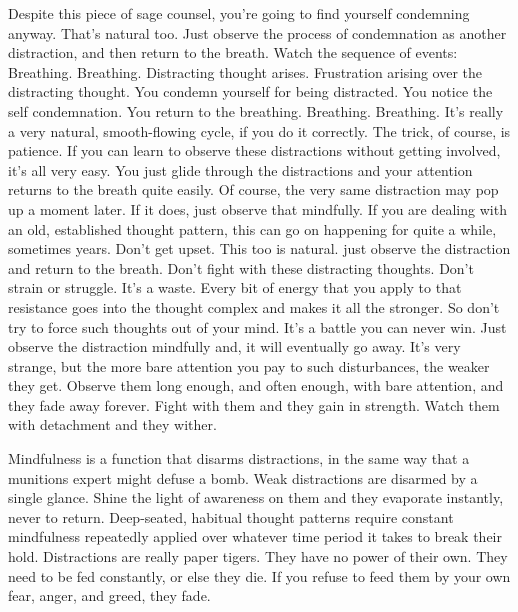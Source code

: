Despite this piece of sage counsel, you're going to find yourself condemning
anyway. That's natural too. Just observe the process of condemnation as another
distraction, and then return to the breath.  Watch the sequence of events:
Breathing. Breathing. Distracting thought arises.  Frustration arising over the
distracting thought.  You condemn yourself for being distracted. You notice the
self condemnation. You return to the breathing. Breathing. Breathing.  It's
really a very natural, smooth-flowing cycle, if you do it correctly. The trick,
of course, is patience. If you can learn to observe these distractions without
getting involved, it's all very easy. You just glide through the distractions
and your attention returns to the breath quite easily. Of course, the very same
distraction may pop up a moment later. If it does, just observe that mindfully.
If you are dealing with an old, established thought pattern, this can go on
happening for quite a while, sometimes years. Don't get upset.  This too is
natural. just observe the distraction and return to the breath.  Don't fight
with these distracting thoughts. Don't strain or struggle. It's a waste. Every
bit of energy that you apply to that resistance goes into the thought complex
and makes it all the stronger. So don't try to force such thoughts out of your
mind. It's a battle you can never win. Just observe the distraction mindfully
and, it will eventually go away. It's very strange, but the more bare attention
you pay to such disturbances, the weaker they get.  Observe them long enough,
and often enough, with bare attention, and they fade away forever. Fight with
them and they gain in strength. Watch them with detachment and they wither.

Mindfulness is a function that disarms distractions, in the same way that a
munitions expert might defuse a bomb. Weak distractions are disarmed by a single
glance. Shine the light of awareness on them and they evaporate instantly, never
to return.  Deep-seated, habitual thought patterns require constant mindfulness
repeatedly applied over whatever time period it takes to break their hold.
Distractions are really paper tigers. They have no power of their own. They need
to be fed constantly, or else they die.  If you refuse to feed them by your own
fear, anger, and greed, they fade.


